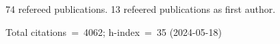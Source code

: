 74 refereed publications. 13 refeered publications as first author.

Total citations~=~4062; h-index~=~35 (2024-05-18)